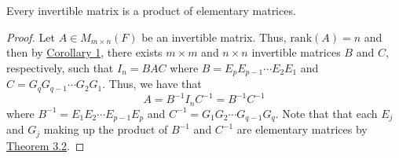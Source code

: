 \begin{corollary}\label{Corollary 3 to Theorem 3.6}
   Every invertible matrix is a product of elementary matrices. 
\end{corollary}
\begin{proof}
Let \( A \in {M}_{m \times n }(F)  \) be an invertible matrix. Thus, \( \text{rank}(A) = n  \) and then by {\hyperref[Corollary 1 to Theorem 3.6]{Corollary 1}}, there exists \( m \times m  \) and \( n \times n  \) invertible matrices \( B  \) and \( C  \), respectively, such that  \( {I}_{n} = BAC \) where \( B = {E}_{p} {E}_{p-1} \cdots {E}_{2} {E}_{1} \) and \( C =  {G}_{q} {G}_{q-1} \cdots {G}_{2} {G}_{1}\). Thus, we have that 
\[  A = B^{-1}{I}_{n}C^{-1} = {B}^{-1}C^{-1}\]
where \(B^{-1} = {E}_{1} {E}_{2} \cdots {E}_{p-1}{E}_{p} \) and \( C^{-1} = {G}_{1} {G}_{2} \cdots {G}_{q-1} {G}_{q}  \). Note that that each \( {E}_{j}  \) and \( {G}_{j}   \) making up the product of \( B^{-1}  \) and \( C^{-1} \) are elementary matrices by {\hyperref[Theorem 3.2]{Theorem 3.2}}.
\end{proof}

